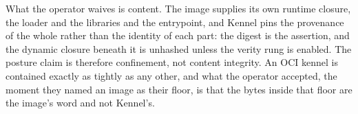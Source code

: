 What the operator waives is content. The image supplies its own runtime
closure, the loader and the libraries and the entrypoint, and Kennel
pins the provenance of the whole rather than the identity of each part:
the digest is the assertion, and the dynamic closure beneath it is
unhashed unless the verity rung is enabled. The posture claim is
therefore confinement, not content integrity. An OCI kennel is contained
exactly as tightly as any other, and what the operator accepted, the
moment they named an image as their floor, is that the bytes inside that
floor are the image's word and not Kennel's.

